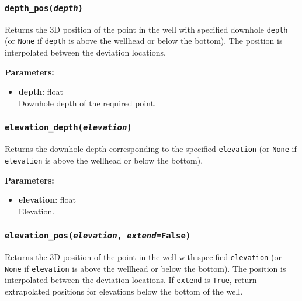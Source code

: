 \begin{snugshade}
\subsubsection{\texttt{depth\_pos(\emph{depth})}}
\end{snugshade}
\label{sec:well:depth_pos}

Returns the 3D position of the point in the well with specified downhole \texttt{depth} (or \texttt{None} if \texttt{depth} is above the wellhead or below the bottom).  The position is interpolated between the deviation locations.

\textbf{Parameters:}
\begin{itemize}
\item \textbf{depth}: float\\
  Downhole depth of the required point.
\end{itemize}

\begin{snugshade}
\subsubsection{\texttt{elevation\_depth(\emph{elevation})}}
\end{snugshade}
\label{sec:well:elevation_depth}

Returns the downhole depth corresponding to the specified \texttt{elevation} (or \texttt{None} if \texttt{elevation} is above the wellhead or below the bottom).

\textbf{Parameters:}
\begin{itemize}
\item \textbf{elevation}: float\\
  Elevation.
\end{itemize}

\begin{snugshade}
\subsubsection{\texttt{elevation\_pos(\emph{elevation}, \emph{extend}=\texttt{False})}}
\end{snugshade}
\label{sec:well:elevation_pos}

Returns the 3D position of the point in the well with specified \texttt{elevation} (or \texttt{None} if \texttt{elevation} is above the wellhead or below the bottom).  The position is interpolated between the deviation locations.  If \texttt{extend} is \texttt{True}, return extrapolated positions for elevations below the bottom of the well.

